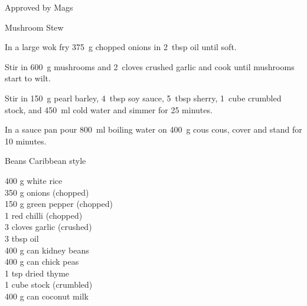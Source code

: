 \begin{menu}{Approved by Mags}
\begin{recipe}{2}{Mushroom Stew}
\begin{ingredients}
		\end{ingredients}
	
	
    \begin{instructions}
    \item 
        In a large wok fry
        375~g chopped onions
        in
        2~tbsp  oil
        until soft.
      \item 
        Stir in
        600~g  mushrooms
        and
        2~cloves crushed garlic
        and cook until mushrooms start to wilt.
      \item 
        Stir in
        150~g  pearl barley,
        4~tbsp  soy sauce,
        5~tbsp  sherry,
        1~cube crumbled stock,
        and
        450~ml  cold water
        and simmer for 25 minutes.
      \item 
      In a
      sauce pan pour 800~ml  boiling water
      on 400~g  cous cous, cover and
      stand for 10 minutes.
    
    \end{instructions}
    \end{recipe}%
  
    \begin{recipe}{2}{Beans Caribbean style}%
    
		\begin{ingredients}
		400 g white rice  \\
	350 g onions (chopped) \\
	150 g green pepper (chopped) \\
	1  red chilli (chopped) \\
	3 cloves garlic (crushed) \\
	3 tbsp oil  \\
	400 g can kidney beans  \\
	400 g can chick peas  \\
	1 tsp dried thyme  \\
	1 cube stock (crumbled) \\
	400 g can coconut milk  \\
	
		\end{ingredients}
	
	

\end{recipe}
\end{menu}
